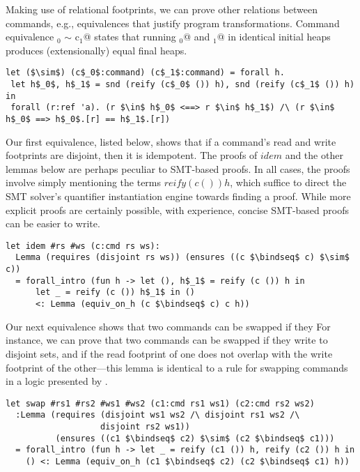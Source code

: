 \documentclass[sigplan,screen]{acmart}\settopmatter{}
\begin{document}
Making use of relational footprints, we can prove other relations
between commands, e.g., equivalences that justify program
transformations. Command equivalence \ls@c$_0$ $\sim$ c$_1$@ states
that running \ls@c$_0$@ and \ls@c$_1$@ in identical initial heaps
produces (extensionally) equal final heaps.

\begin{lstlisting}
let ($\sim$) (c$_0$:command) (c$_1$:command) = forall h.
 let h$_0$, h$_1$ = snd (reify (c$_0$ ()) h), snd (reify (c$_1$ ()) h) in
 forall (r:ref 'a). (r $\in$ h$_0$ <==> r $\in$ h$_1$) /\ (r $\in$ h$_0$ ==> h$_0$.[r] == h$_1$.[r])
\end{lstlisting}

\iffull
Our first equivalence, listed below, shows that if a command's read and write
footprints are disjoint, then it is idempotent.
%
The proofs of \ls$idem$ and the other lemmas below are perhaps
peculiar to SMT-based proofs. In all cases, the proofs involve simply
mentioning the terms \ls$reify (c ()) h$, which suffice to direct the
SMT solver's quantifier instantiation engine towards finding a
proof. While more explicit proofs are certainly possible, with
experience, concise SMT-based proofs can be easier to write.

\begin{lstlisting}
let idem #rs #ws (c:cmd rs ws): 
  Lemma (requires (disjoint rs ws)) (ensures ((c $\bindseq$ c) $\sim$ c))
  = forall_intro (fun h -> let (), h$_1$ = reify (c ()) h in 
      let _ = reify (c ()) h$_1$ in () 
      <: Lemma (equiv_on_h (c $\bindseq$ c) c h))
\end{lstlisting}

Our next equivalence shows that two commands can be swapped if they
\else
For instance, we can prove that two commands can be swapped if they
\fi
write to disjoint sets, and if the read footprint of one does not
overlap with the write footprint of the other---this lemma is
identical to a rule for swapping commands in a logic presented
by \citet{BartheGB09}.

\begin{lstlisting}
let swap #rs1 #rs2 #ws1 #ws2 (c1:cmd rs1 ws1) (c2:cmd rs2 ws2)
  :Lemma (requires (disjoint ws1 ws2 /\ disjoint rs1 ws2 /\ 
                   disjoint rs2 ws1))
          (ensures ((c1 $\bindseq$ c2) $\sim$ (c2 $\bindseq$ c1)))
  = forall_intro (fun h -> let _ = reify (c1 ()) h, reify (c2 ()) h in 
    () <: Lemma (equiv_on_h (c1 $\bindseq$ c2) (c2 $\bindseq$ c1) h))
\end{lstlisting}
\end{document}

